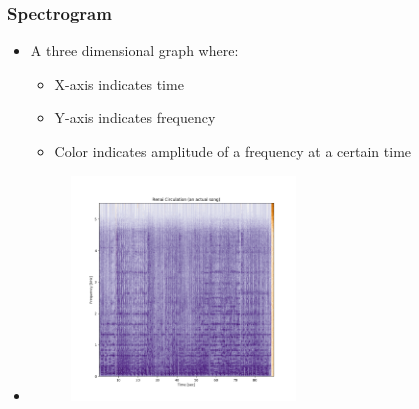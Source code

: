 \documentclass{beamer}
\begin{document}
\begin{frame}[t]
    \frametitle{Spectrogram}
    \begin{itemize}
        \item A three dimensional graph where:
        \begin{itemize}
            \item X-axis indicates time
            \item Y-axis indicates frequency
            \item Color indicates amplitude of a frequency at a certain time
        \end{itemize}
        \item \begin{figure}
            \includegraphics[width=0.5625\textwidth]{Spectrogram_Specimens/ActualSong.png}
        \end{figure}
    \end{itemize}
\end{frame}
\end{document}
